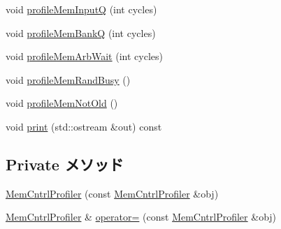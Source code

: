\begin{DoxyCompactItemize}
\item 
void \hyperlink{classMemCntrlProfiler_a4a3a012728231422d396cd10cbdf3d16}{profileMemInputQ} (int cycles)
\item 
void \hyperlink{classMemCntrlProfiler_aa3f67ffbded5f5e56923578d9854457c}{profileMemBankQ} (int cycles)
\item 
void \hyperlink{classMemCntrlProfiler_ac4e5c37195851ad5b8c630f04595034b}{profileMemArbWait} (int cycles)
\item 
void \hyperlink{classMemCntrlProfiler_a091de1a0e944399fbb9ee4311a8dc1c4}{profileMemRandBusy} ()
\item 
void \hyperlink{classMemCntrlProfiler_a9c6e4338190ce42950932dd07b6bd632}{profileMemNotOld} ()
\item 
void \hyperlink{classMemCntrlProfiler_ac55fe386a101fbae38c716067c9966a0}{print} (std::ostream \&out) const 
\end{DoxyCompactItemize}
\subsection*{Private メソッド}
\begin{DoxyCompactItemize}
\item 
\hyperlink{classMemCntrlProfiler_a4d56d6af93aa1efbd1b1b14344a11f5d}{MemCntrlProfiler} (const \hyperlink{classMemCntrlProfiler}{MemCntrlProfiler} \&obj)
\item 
\hyperlink{classMemCntrlProfiler}{MemCntrlProfiler} \& \hyperlink{classMemCntrlProfiler_ae886286a55686443c6634d631bd3c8eb}{operator=} (const \hyperlink{classMemCntrlProfiler}{MemCntrlProfiler} \&obj)
\end{DoxyCompactItemize}
